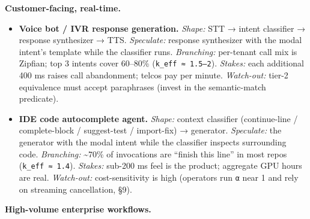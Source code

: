 \documentclass[
  11pt,
]{article}
\begin{document}
\textbf{Customer-facing, real-time.}

\begin{itemize}
\item
  \textbf{Voice bot / IVR response generation.} \emph{Shape:} STT →
  intent classifier → response synthesizer → TTS. \emph{Speculate:}
  response synthesizer with the modal intent's template while the
  classifier runs. \emph{Branching:} per-tenant call mix is Zipfian; top
  3 intents cover 60--80\% (\texttt{k\_eff\ ≈\ 1.5–2}). \emph{Stakes:}
  each additional 400 ms raises call abandonment; telcos pay per minute.
  \emph{Watch-out:} tier-2 equivalence must accept paraphrases (invest
  in the semantic-match predicate).
\item
  \textbf{IDE code autocomplete agent.} \emph{Shape:} context classifier
  (continue-line / complete-block / suggest-test / import-fix) →
  generator. \emph{Speculate:} the generator with the modal intent while
  the classifier inspects surrounding code. \emph{Branching:}
  \textasciitilde70\% of invocations are ``finish this line'' in most
  repos (\texttt{k\_eff\ ≈\ 1.4}). \emph{Stakes:} sub-200 ms feel is the
  product; aggregate GPU hours are real. \emph{Watch-out:}
  cost-sensitivity is high (operators run \texttt{α} near 1 and rely on
  streaming cancellation, §9).
\end{itemize}

\textbf{High-volume enterprise workflows.}
\end{document}
